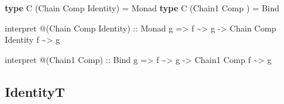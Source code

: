 \documentclass[]{article}
\newenvironment{Shaded}{}{}
\newcommand{\DataTypeTok}[1]{\textcolor[rgb]{0.56,0.13,0.00}{#1}}
\newcommand{\KeywordTok}[1]{\textcolor[rgb]{0.00,0.44,0.13}{\textbf{#1}}}
\newcommand{\NormalTok}[1]{#1}
\newcommand{\OperatorTok}[1]{\textcolor[rgb]{0.40,0.40,0.40}{#1}}
\newcommand{\OtherTok}[1]{\textcolor[rgb]{0.00,0.44,0.13}{#1}}
\begin{document}
\begin{itemize}
\begin{Shaded}
\begin{Highlighting}[]
\KeywordTok{type} \DataTypeTok{C}\NormalTok{ (}\DataTypeTok{Chain}  \DataTypeTok{Comp} \DataTypeTok{Identity}\NormalTok{) }\OtherTok{=} \DataTypeTok{Monad}
\KeywordTok{type} \DataTypeTok{C}\NormalTok{ (}\DataTypeTok{Chain1} \DataTypeTok{Comp}\NormalTok{         ) }\OtherTok{=} \DataTypeTok{Bind}

\NormalTok{interpret }\OperatorTok{@}\NormalTok{(}\DataTypeTok{Chain} \DataTypeTok{Comp} \DataTypeTok{Identity}\NormalTok{)}
\OtherTok{    ::} \DataTypeTok{Monad}\NormalTok{ g}
    \OtherTok{=>}\NormalTok{ f }\OperatorTok{\textasciitilde{}>}\NormalTok{ g}
    \OtherTok{{-}>} \DataTypeTok{Chain} \DataTypeTok{Comp} \DataTypeTok{Identity}\NormalTok{ f }\OperatorTok{\textasciitilde{}>}\NormalTok{ g}

\NormalTok{interpret }\OperatorTok{@}\NormalTok{(}\DataTypeTok{Chain1} \DataTypeTok{Comp}\NormalTok{)}
\OtherTok{    ::} \DataTypeTok{Bind}\NormalTok{ g}
    \OtherTok{=>}\NormalTok{ f }\OperatorTok{\textasciitilde{}>}\NormalTok{ g}
    \OtherTok{{-}>} \DataTypeTok{Chain1} \DataTypeTok{Comp}\NormalTok{ f }\OperatorTok{\textasciitilde{}>}\NormalTok{ g}
\end{Highlighting}
\end{Shaded}
\end{itemize}

\hypertarget{identityt}{%
\subsection{IdentityT}\label{identityt}}
\end{document}
